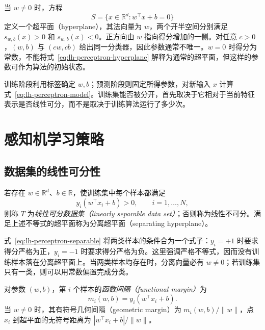 当 $w\neq 0$ 时，方程
\begin{equation}
\label{eq:lh-perceptron-hyperplane}
S=\{x\in\mathbb R^d:w^\top x+b=0\}
\end{equation}
定义一个超平面（hyperplane），其法向量为 $w$，两个开半空间分别满足 $s_{w,b}(x)>0$ 和 $s_{w,b}(x)<0$。正方向由 $w$ 指向得分增加的一侧。对任意 $c>0$，$(w,b)$ 与 $(cw,cb)$ 给出同一分类器，因此参数通常不唯一。$w=0$ 时得分为常数，不能将式~\eqref{eq:lh-perceptron-hyperplane} 解释为通常的超平面，但这样的参数可作为算法的初始状态。

训练阶段利用标签确定 $w,b$；预测阶段则固定所得参数，对新输入 $x$ 计算式~\eqref{eq:lh-perceptron-model}。训练集能否被分开，首先取决于它相对于当前特征表示是否线性可分，而不是取决于训练算法运行了多少次。

\section{感知机学习策略}
\label{sec:lh-perceptron-strategy}

\subsection{数据集的线性可分性}
\label{subsec:lh-perceptron-separability}

\begin{definition}[线性可分性]
\label{def:lh-linear-separability}
若存在 $w\in\mathbb R^d$、$b\in\mathbb R$，使训练集中每个样本都满足
\begin{equation}
\label{eq:lh-perceptron-separable}
y_i(w^\top x_i+b)>0,
\qquad i=1,\ldots,N,
\end{equation}
则称 $T$ 为\emph{线性可分数据集（linearly separable data set）}；否则称为线性不可分。满足上述不等式的超平面称为分离超平面（separating hyperplane）。
\end{definition}

式~\eqref{eq:lh-perceptron-separable} 将两类样本的条件合为一个式子：$y_i=+1$ 时要求得分严格为正，$y_i=-1$ 时要求得分严格为负。这里强调严格不等式，因而没有训练样本落在分离超平面上。当两类样本均存在时，分离向量必有 $w\neq0$；若训练集只有一类，则可以用常数偏置完成分类。

\begin{definition}[函数间隔与几何间隔]
\label{def:lh-perceptron-margin}
对参数 $(w,b)$，第 $i$ 个样本的\emph{函数间隔（functional margin）}为
\begin{equation}
\label{eq:lh-perceptron-functional-margin}
m_i(w,b)=y_i(w^\top x_i+b).
\end{equation}
当 $w\neq0$ 时，其有符号几何间隔（geometric margin）为 $m_i(w,b)/\|w\|$，点 $x_i$ 到超平面的无符号距离为 $|w^\top x_i+b|/\|w\|$。
\end{definition}

